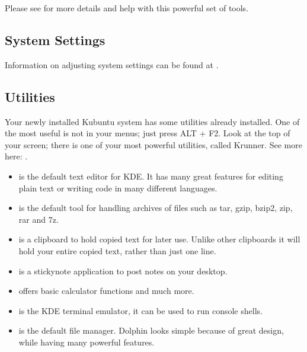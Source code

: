 \documentclass[letterpaper,10pt,english]{sphinxmanual}
\begin{document}
\sphinxAtStartPar
Please see  for more details and help with this powerful set of tools.


\subsection{System Settings}
\label{\detokenize{docs/software-management/software:system-settings}}
\sphinxAtStartPar
Information on adjusting system settings can be found at .


\subsection{Utilities}
\label{\detokenize{docs/software-management/software:utilities}}
\sphinxAtStartPar
Your newly installed Kubuntu system has some utilities already installed. One of the most useful is not in your menus; just press ALT + F2. Look at the top of your screen; there is one of your most powerful utilities, called Krunner. See more here: .
\begin{itemize}
\item {} 
\sphinxAtStartPar
{} is the default text editor for KDE. It has many great features for editing plain text or writing code in many different languages.

\item {} 
\sphinxAtStartPar
{} is the default tool for handling archives of files such as tar, gzip, bzip2, zip, rar and 7z.

\item {} 
\sphinxAtStartPar
{} is a clipboard to hold copied text for later use. Unlike other clipboards it will hold your entire copied text, rather than just one line.

\item {} 
\sphinxAtStartPar
{} is a sticky\sphinxhyphen{}note application to post notes on your desktop.

\item {} 
\sphinxAtStartPar
{} offers basic calculator functions and much more.

\item {} 
\sphinxAtStartPar
{} is the KDE terminal emulator, it can be used to run console shells.

\item {} 
\sphinxAtStartPar
{} is the default file manager. Dolphin looks simple because of great design, while having many powerful features.

\end{itemize}
\end{document}
